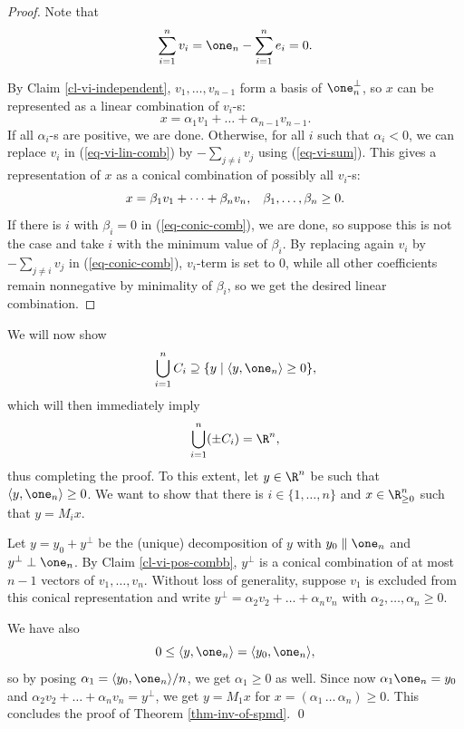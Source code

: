 \documentclass[11pt]{article}
\begin{document}
\begin{proof}
    Note that
    \begin{equation}
        \label{eq-vi-sum}
        \sum_{i=1}^n v_i=\one_n-\sum_{i=1}^ne_i=0.
    \end{equation}
    
    By Claim \ref{cl-vi-independent}, $v_1,\dots,v_{n-1}$ form a basis of $\one_n^{\perp}$, so $x$ can be represented as a linear combination of $v_i$-s:
    \begin{equation}\label{eq-vi-lin-comb}
        x=\alpha_1v_1+\dots+\alpha_{n-1}v_{n-1}.
    \end{equation}
    If all $\alpha_i$-s are positive, we are done. Otherwise, for all $i$ such that $\alpha_i<0$, we can replace $v_i$ in (\ref{eq-vi-lin-comb}) by $-\sum_{j\neq i}v_j$ using (\ref{eq-vi-sum}). This gives a representation of $x$ as a conical combination of possibly all $v_i$-s:
    \begin{equation}\label{eq-conic-comb}
        x=\beta_1v_1+\dots+\beta_nv_n,\hspace{0.3cm} \beta_1,\dots,\beta_n\ge0.
    \end{equation}
    If there is $i$ with $\beta_i=0$ in (\ref{eq-conic-comb}), we are done, so suppose this is not the case and take $i$ with the minimum value of $\beta_i$. By replacing again $v_i$ by $-\sum_{j\neq i}v_j$ in (\ref{eq-conic-comb}), $v_i$-term is set to $0$, while all other coefficients remain nonnegative by minimality of $\beta_i$, so we get the desired linear combination.
\end{proof}

We will now show
$$\bigcup_{i=1}^n C_i\supseteq\{y\mid\langle y,\one_n\rangle\ge0\},$$
which will then immediately imply
$$\bigcup_{i=1}^n (\pm C_i)=\R^n,$$
thus completing the proof. To this extent, let $y\in\R^n$ be such that $\langle y,\one_n\rangle\ge0$. We want to show that there is $i\in\{1,\dots,n\}$ and $x\in\R_{\ge0}^n$ such that $y=M_ix$.

Let $y=y_0+y^{\perp}$ be the (unique) decomposition of $y$ with $y_0\parallel\one_n$ and $y^{\perp}\perp\one_n$. By Claim \ref{cl-vi-pos-combb}, $y^{\perp}$ is a conical combination of at most $n-1$ vectors of $v_1,\dots,v_n$. Without loss of generality, suppose $v_1$ is excluded from this conical representation and write $y^{\perp}=\alpha_2v_2+\dots+ \alpha_{n}v_{n}$ with $\alpha_2,\dots,\alpha_{n}\ge0$. 

We have also 
$$0\le\langle y,\one_n\rangle=\langle y_0,\one_n\rangle,$$
so by posing $\alpha_1=\langle y_0,\one_n\rangle/n$, we get $\alpha_1\ge0$ as well. Since now $\alpha_1\one_n=y_0$ and $\alpha_2v_2+\dots+\alpha_nv_n=y^{\perp}$, we get $y=M_1x$ for $x=(\alpha_1\,\dots\,\alpha_n)\ge0$. This concludes the proof of Theorem \ref{thm-inv-of-spmd}. \qed
\end{document}
